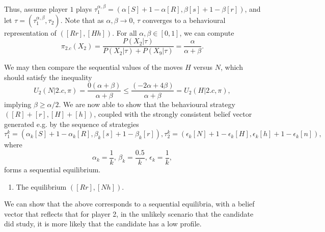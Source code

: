 \begin{example}
Thus, assume player $1$ plays $\tau_1^{\alpha, \beta} = (\alpha[S] + 1-\alpha [R],\beta[s] + 1-\beta [r] )$, and let $\tau = (\tau_{1}^{\alpha, \beta}, \tau_2)$. Note that as $\alpha, \beta  \rightarrow 0$, $\tau$ converges to a behavioural representation of $([Rr], [Hh])$.
For all $\alpha, \beta \in [0,1]$, we can compute 
$$\pi_{2.c}(X_2) = \frac{P(X_2 | \tau)}{ P(X_2 | \tau) + P(X_9 | \tau) }  = \frac{\alpha}{\alpha + \beta}.$$ 

We may then compare the sequential values of the moves $H$ versus $N$, which should satisfy the inequality
$$ U_2(N | 2.c, \pi) = \frac{0 (\alpha + \beta)}{\alpha + \beta} \leq \frac{( - 2\alpha + 4 \beta)}{\alpha + \beta} = U_2(H | 2.c , \pi),  $$
implying $\beta  \geq \alpha/2$. 
We are now able to show that the behavioural strategy $([R] + [r], [H] + [h])$, coupled with the strongly consistent belief vector generated e.g. by the sequence of strategies
$$ \tau_1^k = (\alpha_k [S] + 1-\alpha_k [R], \beta_k [s] + 1-\beta_k [r]), \tau_2^k = (\epsilon_k [N] + 1 - \epsilon_k [H], \epsilon_k [h] +  1-\epsilon_k [n]), $$
where 
$$\alpha_k =\frac{1}{k}, \, \beta_k = \frac{0.5}{k}, \, \epsilon_k = \frac{1}{k},$$
forms a sequential equilibrium.

\begin{enumerate}[resume]
\item The equilibrium $([Rr], [Nh])$.
\end{enumerate}

We can show that the above corresponds to a sequential equilibria, with a belief vector that reflects that for player 2, in the unlikely scenario that the candidate did study, it is more likely that the candidate has a low profile. 
\end{example}
\ifx \globalmark \undefined %


	
\else 
	
\fi

